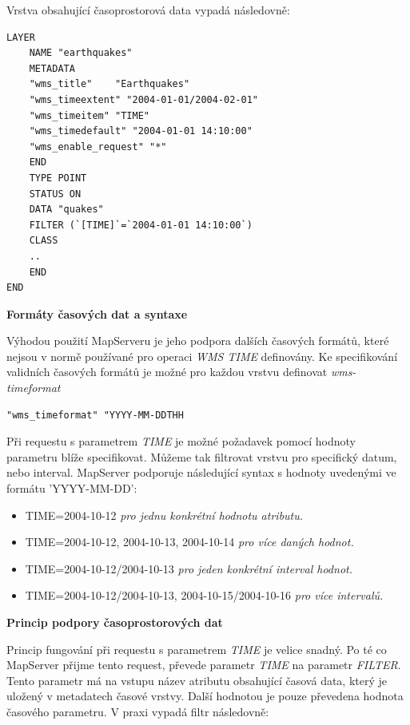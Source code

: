 Vrstva obsahující časoprostorová data vypadá následovně:

\begin{verbatim}
LAYER
	NAME "earthquakes"
	METADATA
	"wms_title"    "Earthquakes"
	"wms_timeextent" "2004-01-01/2004-02-01"
	"wms_timeitem" "TIME"
	"wms_timedefault" "2004-01-01 14:10:00"
	"wms_enable_request" "*"
	END
	TYPE POINT
	STATUS ON
	DATA "quakes"
	FILTER (`[TIME]`=`2004-01-01 14:10:00`)
	CLASS
	..
	END
END
\end{verbatim}

\bigskip
\noindent
\textbf{Formáty časových dat a syntaxe}

Výhodou použití MapServeru je jeho podpora dalších časových formátů, které nejsou v normě používané pro operaci \textit{WMS TIME} definovány. Ke specifikování validních časových formátů je možné pro každou vrstvu definovat \textit{wms-timeformat}

\begin{verbatim}
"wms_timeformat" "YYYY-MM-DDTHH
\end{verbatim}

Při requestu s parametrem \textit{TIME} je možné požadavek pomocí hodnoty parametru blíže specifikovat. Můžeme tak filtrovat vrstvu pro specifický datum, nebo interval. MapServer podporuje následující syntax s hodnoty uvedenými ve formátu 'YYYY-MM-DD':

\begin{itemize}
	\item TIME=2004-10-12 \textit{pro jednu konkrétní hodnotu atributu.}
	\item TIME=2004-10-12, 2004-10-13, 2004-10-14 \textit{pro více daných hodnot.}
	\item TIME=2004-10-12/2004-10-13 \textit{pro jeden konkrétní interval hodnot.}
	\item TIME=2004-10-12/2004-10-13, 2004-10-15/2004-10-16 \textit{pro více intervalů.}
\end{itemize}

\bigskip
\noindent
\textbf{Princip podpory časoprostorových dat}

Princip fungování při requestu s parametrem \textit{TIME} je velice snadný. Po té co MapServer přijme tento request, převede parametr \textit{TIME} na parametr \textit{FILTER}. Tento parametr má na vstupu název atributu obsahující časová data, který je uložený v metadatech časové vrstvy\cite{mapserver_about}. Další hodnotou je pouze převedena hodnota časového parametru. V praxi vypadá filtr následovně:


